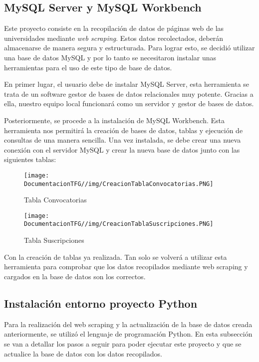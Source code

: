 \subsection{MySQL Server y MySQL Workbench}
Este proyecto consiste en la recopilación de datos de páginas web de las universidades mediante \textit{web scraping}. Estos datos recolectados, deberán almacenarse de manera segura y estructurada. Para lograr esto, se decidió utilizar una base de datos MySQL y por lo tanto se necesitaron instalar unas herramientas para el uso de este tipo de base de datos.

En primer lugar, el usuario debe de instalar MySQL Server, esta herramienta se trata de un software gestor de bases de datos relacionales muy potente. Gracias a ella, nuestro equipo local funcionará como un servidor y gestor de bases de datos.

Posteriormente, se procede a la instalación de MySQL Workbench. Esta herramienta nos permitirá la creación de bases de datos, tablas y ejecución de consultas de una manera sencilla. Una vez instalada, se debe crear una nueva conexión con el servidor MySQL y crear la nueva base de datos junto con las siguientes tablas:

\begin{figure}[H]
    \centering
    \texttt{[image: DocumentacionTFG//img/CreacionTablaConvocatorias.PNG]}
    \caption{Tabla Convocatorias}
\end{figure}

\begin{figure}[H]
    \centering
    \texttt{[image: DocumentacionTFG//img/CreacionTablaSuscripciones.PNG]}
    \caption{Tabla Suscripciones}
\end{figure}

Con la creación de tablas ya realizada. Tan solo se volverá a utilizar esta herramienta para comprobar que los datos recopilados mediante web scraping y cargados en la base de datos son los correctos.

\subsection{Instalación entorno proyecto Python}
Para la realización del web scraping y la actualización de la base de datos creada anteriormente, se utilizó el lenguaje de programación Python. En esta subsección se van a detallar los pasos a seguir para poder ejecutar este proyecto y que se actualice la base de datos con los datos recopilados.

